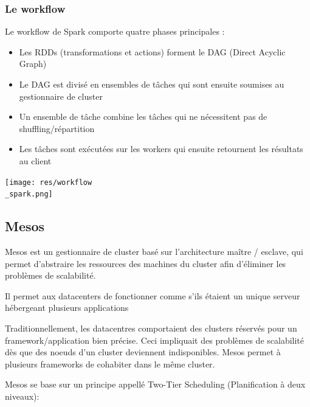 \documentclass[a4paper, 11pt, titlepage]{article}
\begin{document}
\subsubsection* {Le workflow}


Le workflow de Spark comporte quatre phases principales :

\begin{itemize}

\item
Les RDDs (transformations et actions) forment le DAG (Direct Acyclic Graph)

\item
Le DAG est divisé en ensembles de tâches qui sont ensuite soumises au gestionnaire de cluster

\item
Un ensemble de tâche combine les tâches qui ne nécessitent pas de shuffling/répartition

\item
Les tâches sont exécutées sur les workers qui ensuite retournent les résultats au client

\end{itemize}


\begin{center}
\texttt{[image: res/workflow\\\_spark.png]}
\end{center}

\newpage
\subsection {Mesos}

Mesos est un gestionnaire de cluster basé sur l'architecture maître / esclave, qui permet d'abstraire les ressources des machines du cluster afin d'éliminer les problèmes de scalabilité.

Il permet aux datacenters de fonctionner comme s'ils étaient un unique serveur hébergeant plusieurs applications


Traditionnellement, les datacentres comportaient des clusters réservés pour un framework/application bien précise. Ceci impliquait des problèmes de scalabilité dès que des noeuds d'un cluster deviennent indisponibles. Mesos permet à plusieurs frameworks de cohabiter dans le même cluster.


Mesos se base sur un principe appellé Two-Tier Scheduling (Planification à deux niveaux):
\end{document}
